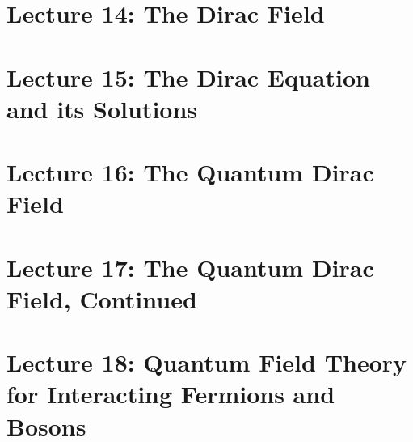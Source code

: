 \documentclass[10pt]{article}
\begin{document}
 

\clearpage

\section*{Lecture 14: The Dirac Field}
\label{sec:lec14}

 

\clearpage

\section*{Lecture 15: The Dirac Equation and its Solutions}
\label{sec:lec15}

 

\clearpage

\section*{Lecture 16: The Quantum Dirac Field}
\label{sec:lec16}

 

\clearpage

\section*{Lecture 17: The Quantum Dirac Field, Continued}
\label{sec:lec17}

 

\clearpage

\section*{Lecture 18: Quantum Field Theory for Interacting Fermions and Bosons}
\label{sec:lec18}

 

\clearpage
\end{document}
